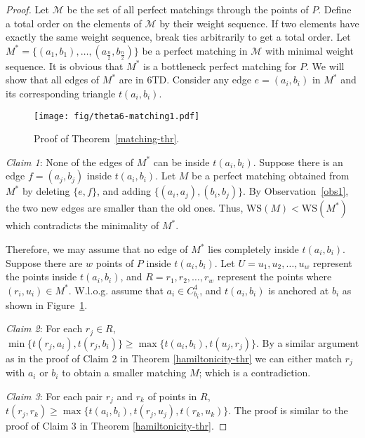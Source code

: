 \documentclass[11pt,a4paper]{article}
\newcommand{\kTD}[2]{$#1$\text{-}TD#2}
\newcommand{\WS}[1]{\text{WS$(#1)$}}
\begin{document}
\begin{proof}
Let $\mathcal{M}$ be the set of all perfect matchings through the points of $P$. Define a total order on the elements of $\mathcal{M}$ by their weight sequence. If two elements have exactly the same weight sequence, break ties arbitrarily to get a total order.
Let $M^* = \{(a_1, b_1),\dots, (a_{\frac{n}{2}}, b_{\frac{n}{2}})\}$ be a perfect matching in $\mathcal{M}$ with minimal weight sequence. It is obvious that $M^*$ is a bottleneck perfect matching for $P$. We will show that all edges of $M^*$ are in \kTD{6}{}. Consider any edge $e = (a_i, b_i)$ in $M^*$ and its corresponding triangle $t(a_i,b_i)$.


\begin{figure}[htb]
  \centering
  \texttt{[image: fig/theta6-matching1.pdf]}
 \caption{Proof of Theorem~\ref{matching-thr}.}
  \label{matching-fig1}
\end{figure}

{\em Claim 1}: None of the edges of $M^*$ can be inside $t(a_i,b_i)$. Suppose there is an edge $f=(a_j, b_j)$ inside $t(a_i,b_i)$. Let $M$ be a perfect matching obtained from $M^*$ by deleting $\{e, f\}$, and adding $\{(a_i, a_j), (b_i, b_j)\}$. By Observation~\ref{obs1}, the two new edges are smaller than the old ones. Thus, $\WS{M}<\WS{M^*}$ which contradicts the minimality of $M^*$.

Therefore, we may assume that no edge of $M^*$ lies completely inside $t(a_i,b_i)$. Suppose there are $w$ points of $P$ inside $t(a_i,b_i)$. Let $U = u_1, u_2,\dots, u_w$ represent the points inside $t(a_i, b_i)$, and $R=r_1, r_2,\dots, r_w$ represent the points where $(r_i,u_i)\in M^*$. W.l.o.g. assume that $a_i\in C^4_{b_i}$, and $t(a_i,b_i)$ is anchored at $b_i$ as shown in Figure~\ref{matching-fig1}.  

{\em Claim 2}: For each $r_j\in R$, $\min\{t(r_j, a_i), t(r_j, b_i)\} \ge \max\{t(a_i, b_i), t(u_j, r_j)\}$. By a similar argument as in the proof of Claim 2 in Theorem \ref{hamiltonicity-thr} we can either match $r_j$ with $a_i$ or $b_i$ to obtain a smaller matching $M$; which is a contradiction.

{\em Claim 3}: For each pair $r_j$ and $r_k$ of points in $R$, $t(r_j, r_k)\ge \max\{t(a_i, b_i), t(r_j, u_j), t(r_k, u_k)\}$. The proof is similar to the proof of Claim 3 in Theorem \ref{hamiltonicity-thr}.


\end{proof}
\end{document}
